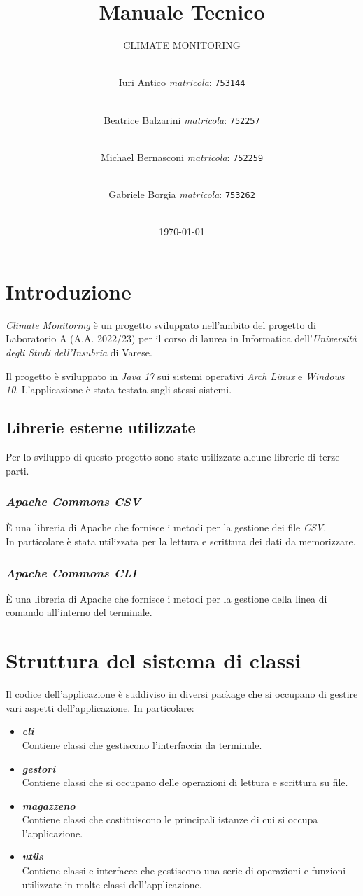 \documentclass[a4paper, 12pt]{scrreprt}
\title {Manuale Tecnico}
\subtitle{CLIMATE MONITORING}
\author{
	\\Iuri Antico \textsl{matricola}:
	\texttt{753144}
	\and \\
	Beatrice Balzarini \textsl{matricola}:
	\texttt{752257}
	\and \\
	Michael Bernasconi \textsl{matricola}:
	\texttt{752259}
	\and \\
	Gabriele Borgia \textsl{matricola}:
	\texttt{753262}\\\\
	}
\date{\today}
\begin{document}
	\maketitle
	\tableofcontents

	\chapter{Introduzione}
	\textsl{Climate Monitoring} \`e un progetto sviluppato nell’ambito del progetto di Laboratorio A (A.A. 2022/23) per il
	corso di laurea in Informatica dell’\textsl{Universit\`a degli Studi dell’Insubria} di Varese.

	Il progetto \`e sviluppato in \textsl{Java 17} sui sistemi operativi \textsl{Arch Linux} e \textsl{Windows 10}.
	L'applicazione \`e stata testata sugli stessi sistemi.
		\section{Librerie esterne utilizzate}
		Per lo sviluppo di questo progetto sono state utilizzate alcune librerie di terze parti.
			\subsection{\textsl{Apache Commons CSV}}
			\`E una libreria di Apache che fornisce i metodi per la gestione dei file \textsl{CSV}. \\In particolare \`e stata utilizzata per la lettura e scrittura dei dati da memorizzare.
			\subsection{\textsl{Apache Commons CLI}}
			\`E una libreria di Apache che fornisce i metodi per la gestione della linea di comando all'interno del terminale.

	\chapter{Struttura del sistema di classi}
	Il codice dell'applicazione \`e suddiviso in diversi package che si occupano di gestire vari aspetti dell'applicazione. In particolare:
	\begin{itemize}
		\item \textbf{\textsl{cli}}\\Contiene classi che gestiscono l'interfaccia da terminale.
		\item \textbf{\textsl{gestori}}\\Contiene classi che si occupano delle operazioni di lettura e scrittura su file.
		\item \textbf{\textsl{magazzeno}}\\Contiene classi che costituiscono le principali istanze di cui si occupa l'applicazione.
		\item \textbf{\textsl{utils}}\\Contiene classi e interfacce che gestiscono una serie di operazioni e funzioni utilizzate in molte classi dell'applicazione.
	\end{itemize}
\end{document}
